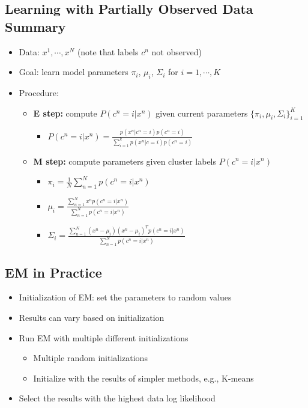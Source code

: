 \documentclass[10pt]{article}
\begin{document}
\subsection*{Learning with Partially Observed Data Summary}
\begin{itemize}
	\item Data: $x^1, \cdots, x^N$ (note that labels $c^n$ not observed)
	\item Goal: learn model parameters $\pi_i$, $\mu_i$, $\Sigma_i$ for $i = 1, \cdots, K$
    \item Procedure: 
    \begin{itemize}
	    \item \textbf{E step:} compute $P(c^n = i | x^n)$ given current parameters $\{\pi_i, \mu_i, \Sigma_i\}_{i = 1}^K$
        \begin{itemize}
	        \item $P(c^n = i | x^n) = \frac{p(x^n | c^n = i) p(c^n = i)}{\sum_{i = 1}^k p(x^n | c = i) p(c^n = i)}$
        \end{itemize}
        \item \textbf{M step:} compute parameters given cluster labels $P(c^n = i | x^n)$
        \begin{itemize}
	        \item $\pi_i = \frac{1}{N} \sum_{n = 1}^N p(c^n = i | x^n)$ 
	        \item $\mu_i = \frac{\sum_{n = 1}^N x^n p(c^n = i | x^n)}{\sum_{n = 1}^N p(c^n = i | x^n)}$
	        \item $\Sigma_i = \frac{\sum_{n = 1}^N (x^n - \mu_i)(x^n - \mu_i)^T p(c^n = i | x^n)}{\sum_{n = 1}^N p(c^n = i | x^n)}$
        \end{itemize}
    \end{itemize}
\end{itemize}

\subsection*{EM in Practice}
\begin{itemize}
	\item Initialization of EM: set the parameters to random values
	\item Results can vary based on initialization
	\item Run EM with multiple different initializations
	\begin{itemize}
	    \item Multiple random initializations
	    \item Initialize with the results of simpler methods, e.g., K-means
    \end{itemize}
    \item Select the results with the highest data log likelihood
\end{itemize}
\end{document}
